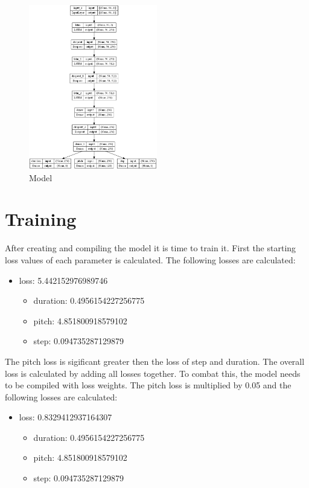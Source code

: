 \begin{figure}
\centering
\includegraphics[width=0.5\textwidth]{./pics/model_plot.png}
\caption{Model}
\label{fig:model}    
\end{figure}

\section{Training}
\label{training}

After creating and compiling the model it is time to train it. First the starting loss values of each parameter is calculated. The following losses
are calculated:

\begin{itemize}
  \item loss: 5.442152976989746
  \begin{itemize}
  \item duration: 0.4956154227256775
  \item pitch: 4.851800918579102
  \item step: 0.094735287129879
  \end{itemize}
\end{itemize}

The pitch loss is sigificant greater then the loss of step and duration. The overall loss is calculated by adding all losses together.
To combat this, the model needs to be compiled with loss weights. The pitch loss is multiplied by 0.05 and the following losses 
are calculated:

\begin{itemize}
  \item loss: 0.8329412937164307
  \begin{itemize}
  \item duration: 0.4956154227256775
  \item pitch: 4.851800918579102
  \item step: 0.094735287129879
  \end{itemize}
\end{itemize}


